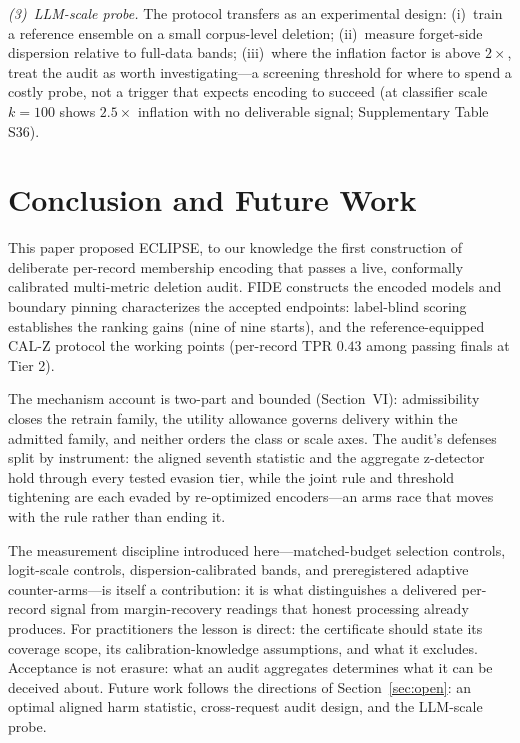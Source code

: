 \documentclass[lettersize,journal]{IEEEtran}
\begin{document}
\emph{(3)~LLM-scale probe.} The protocol transfers as an
experimental design: (i)~train a reference ensemble on
a small corpus-level deletion; (ii)~measure forget-side
dispersion relative to full-data bands; (iii)~where the
inflation factor is above $2\times$, treat the audit as worth
investigating---a screening threshold for where to spend a
costly probe, not a trigger that expects encoding to succeed
(at classifier scale $k{=}100$ shows $2.5\times$ inflation
with no deliverable signal; Supplementary Table S36).


\section{Conclusion and Future Work}\label{sec:conclusion}
This paper proposed ECLIPSE, to our knowledge the first
construction of deliberate per-record membership encoding
that passes a live, conformally calibrated multi-metric
deletion audit. FIDE constructs the encoded models and
boundary pinning characterizes the accepted endpoints:
label-blind scoring establishes the ranking gains (nine of
nine starts), and the reference-equipped CAL-Z protocol the
working points (per-record TPR $0.43$ among passing finals
at Tier 2).

The mechanism account is two-part and bounded (Section~VI):
admissibility closes the retrain family, the utility allowance
governs delivery within the admitted family, and neither
orders the class or scale axes. The audit's defenses
split by instrument: the aligned seventh statistic and the
aggregate z-detector hold through every tested evasion tier,
while the joint rule and threshold tightening are each evaded
by re-optimized encoders---an arms race that moves with the
rule rather than ending it.

The measurement discipline introduced here---matched-budget
selection controls, logit-scale controls,
dispersion-calibrated bands, and preregistered adaptive
counter-arms---is itself a contribution: it is what
distinguishes a delivered per-record signal from
margin-recovery readings that honest processing already
produces. For practitioners the lesson is direct: the
certificate should state its coverage scope, its
calibration-knowledge assumptions, and what it excludes.
Acceptance is not erasure: what an audit aggregates
determines what it can be deceived about. Future work
follows the directions of Section~\ref{sec:open}: an optimal
aligned harm statistic, cross-request audit design, and the
LLM-scale probe.




\IEEEtriggercmd{\enlargethispage{7\baselineskip}}


\end{document}
